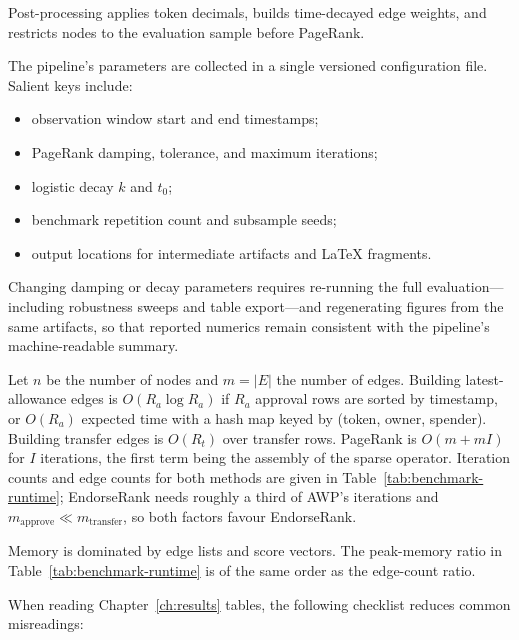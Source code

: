 Post-processing applies token decimals, builds time-decayed edge weights, and restricts nodes to the evaluation sample before PageRank.


The pipeline's parameters are collected in a single versioned configuration file. Salient keys include:

\begin{itemize}
\item observation window start and end timestamps;
\item PageRank damping, tolerance, and maximum iterations;
\item logistic decay $k$ and $t_0$;
\item benchmark repetition count and subsample seeds;
\item output locations for intermediate artifacts and LaTeX fragments.
\end{itemize}

Changing damping or decay parameters requires re-running the full evaluation---including robustness sweeps and table export---and regenerating figures from the same artifacts, so that reported numerics remain consistent with the pipeline's machine-readable summary.


Let $n$ be the number of nodes and $m=|E|$ the number of edges. Building latest-allowance edges is $O(R_a\log R_a)$ if $R_a$ approval rows are sorted by timestamp, or $O(R_a)$ expected time with a hash map keyed by (token, owner, spender). Building transfer edges is $O(R_t)$ over transfer rows. PageRank is $O(m + mI)$ for $I$ iterations, the first term being the assembly of the sparse operator. Iteration counts and edge counts for both methods are given in Table~\ref{tab:benchmark-runtime}; EndorseRank needs roughly a third of AWP's iterations and $m_{\mathrm{approve}}\ll m_{\mathrm{transfer}}$, so both factors favour EndorseRank.

Memory is dominated by edge lists and score vectors. The peak-memory ratio in Table~\ref{tab:benchmark-runtime} is of the same order as the edge-count ratio.


When reading Chapter~\ref{ch:results} tables, the following checklist reduces common misreadings:

